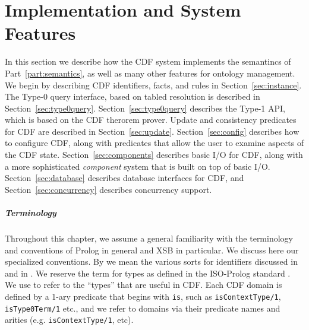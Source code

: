 \chapter{Implementation and System Features} \label{sec:impl}

In this section we describe how the CDF system implements the
semantincs of Part~\ref{part:semantics}, as well as many other
features for ontology management.  We begin by describing CDF
identifiers, facts, and rules in Section~\ref{sec:instance}.  The
Type-0 query interface, based on tabled resolution is described in
Section~\ref{sec:type0query}.  Section~\ref{sec:type0query} describes
the Type-1 API, which is based on the CDF therorem prover.  Update and
consistency predicates for CDF are described in
Section~\ref{sec:update}.  Section~\ref{sec:config} describes how to
configure CDF, along with predicates that allow the user to examine
aspects of the CDF state.  Section~\ref{sec:components} describes
basic I/O for CDF, along with a more sophisticated {\em component}
system that is built on top of basic I/O.  Section~\ref{sec:database}
describes database interfaces for CDF, and
Section~\ref{sec:concurrency} describes concurrency support.
%

\paragraph{Terminology}
Throughout this chapter, we assume a general familiarity with the
terminology and conventions of Prolog in general and XSB in
particular.  We discuss here our specialized conventions.  By
 we mean the various sorts for identifiers discussed in
 and in .  We reserve the term
 for types as defined in the ISO-Prolog standard
\cite{ISO}.  We use  to refer to the ``types'' that are
useful in CDF.  Each CDF domain is defined by a 1-ary predicate that
begins with {\tt is}, such as {\tt isContextType/1}, {\tt
isType0Term/1} etc., and we refer to domains via their predicate names
and arities (e.g. {\tt isContextType/1}, etc).


 









